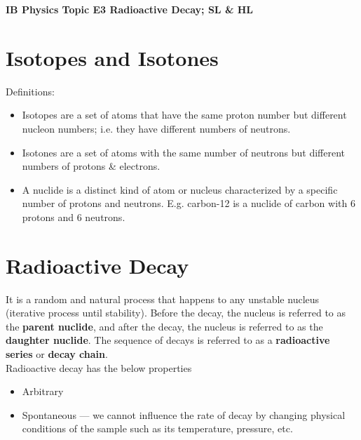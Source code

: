 \documentclass[a4paper,12pt]{article}
\let\oldsection\section
\renewcommand\section{\clearpage\oldsection}
\newcommand{\lb}{\\[8pt]}
\begin{document}
\pagestyle{fancy}


\begin{titlepage}
  \begin{center}

    \vspace*{8cm}
    \textbf{\Large {IB Physics Topic E3 Radioactive Decay; SL \& HL}}


  \end{center}
\end{titlepage}

\pagebreak
\tableofcontents
\pagebreak

\clearpage
\setcounter{page}{1}

\section{Isotopes and Isotones}

Definitions:

\begin{itemize}
  \item Isotopes are a set of atoms that have the same proton number but different nucleon numbers; i.e. they have different numbers of neutrons.
  \item Isotones are a set of atoms with the same number of neutrons but different numbers of protons \& electrons.
  \item A nuclide is a distinct kind of atom or nucleus characterized by a specific number of protons and neutrons. E.g. carbon-12 is a nuclide of carbon with 6 protons and 6 neutrons.
\end{itemize}

\section{Radioactive Decay}

It is a random and natural process that happens to any unstable nucleus (iterative process until stability). Before the decay, the nucleus is referred to as the \textbf{parent nuclide}, and after the decay, the nucleus is referred to as the \textbf{daughter nuclide}. The sequence of decays is referred to as a \textbf{radioactive series} or \textbf{decay chain}.\lb
Radioactive decay has the below properties
\begin{itemize}
  \item Arbitrary
  \item Spontaneous --- we cannot influence the rate of decay by changing physical conditions of the sample such as its temperature, pressure, etc.
\end{itemize}
\end{document}

